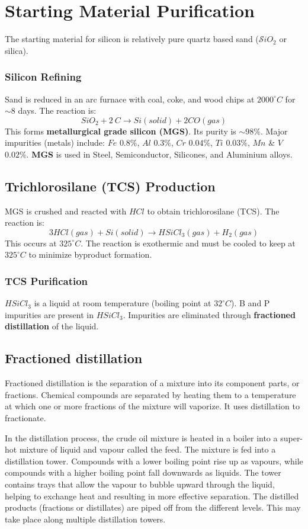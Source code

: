 \documentclass{report}
\begin{document}
\section{Starting Material Purification}
The starting material for silicon is relatively pure quartz based sand ($\mathcal{S}iO_{2}$ or silica).
\subsubsection{Silicon Refining}
Sand is reduced in an arc furnace with coal, coke, and wood chips at $2000^{\circ}C$ for $\sim 8$ days.
The reaction is:
$$SiO_{2}+2~C\rightarrow Si(solid)+2CO(gas)$$
This forms \textbf{metallurgical grade silicon (MGS)}. Its purity is $\sim 98\%$. Major impurities (metals) include: $Fe$ $0.8\%$, $Al$ $0.3\%$, $Cr$ $0.04\%$, $Ti$ $0.03\%$, $Mn$ \& $V$ $0.02\%$. \textbf{MGS} is used in Steel, Semiconductor, Silicones, and Aluminium alloys.

\subsection{Trichlorosilane (TCS) Production}
MGS is crushed and reacted with $HCl$ to obtain trichlorosilane (TCS).
The reaction is:
$$3HCl (gas) + Si (solid) \rightarrow HSiCl_{3} (gas) + H_{2} (gas)$$
This occurs at $325^{\circ}C$. The reaction is exothermic and must be cooled to keep at $325^{\circ}C$ to minimize byproduct formation.

\subsubsection{TCS Purification}
$HSiCl_{3}$ is a liquid at room temperature (boiling point at $32^{\circ}C$). B and P impurities are present in $HSiCl_{3}$. Impurities are eliminated through \textbf{fractioned distillation} of the liquid.

\subsection{Fractioned distillation} 
Fractioned distillation is the separation of a mixture into its component parts, or fractions. Chemical compounds are separated by heating them to a temperature at which one or more fractions of the mixture will vaporize. It uses distillation to fractionate.

In the distillation process, the crude oil mixture is heated in a boiler into a super-hot mixture of liquid and vapour called the feed. The mixture is fed into a distillation tower. Compounds with a lower boiling point rise up as vapours, while compounds with a higher boiling point fall downwards as liquids. The tower contains trays that allow the vapour to bubble upward through the liquid, helping to exchange heat and resulting in more effective separation. The distilled products (fractions or distillates) are piped off from the different levels. This may take place along multiple distillation towers.
\end{document}
